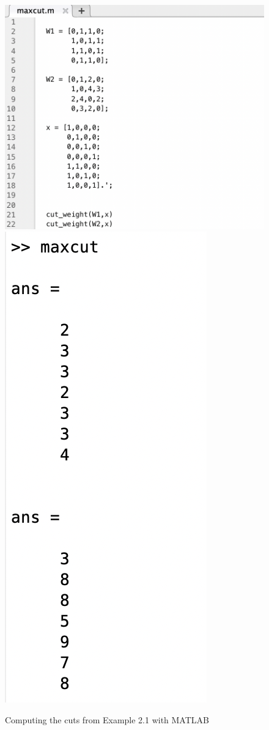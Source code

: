 \begin{figure}[h]
    \centering \includegraphics[scale=.5]{matlab_program.png}
    \includegraphics[scale=.5]{matlab_output.png}
    \caption{Computing the cuts from Example 2.1 with MATLAB}
    \label{fig:matlab_four_vertex}
\end{figure}